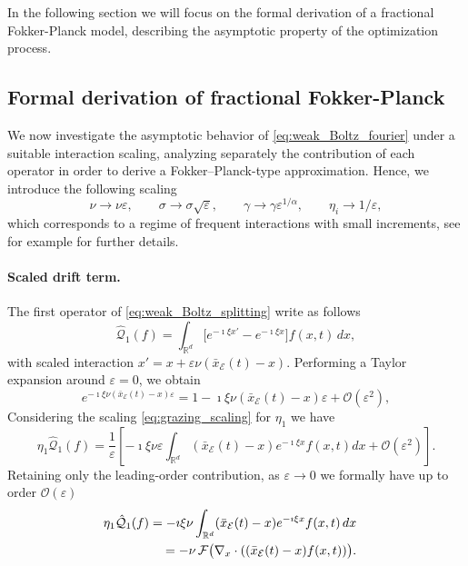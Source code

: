 \documentclass[11pt,handout]{article}%
\numberwithin{equation}{section}
\theoremstyle{definition}
\def\RR{\mathbb R}
\begin{document}
In the following section we will focus on the formal derivation of a fractional Fokker-Planck model, describing the asymptotic property of the optimization process.

\subsection{Formal derivation of fractional Fokker-Planck}\label{sec:FPE} 
We now investigate the asymptotic behavior of \eqref{eq:weak_Boltz_fourier} under a suitable interaction scaling, analyzing separately the contribution of each operator in order to derive a Fokker--Planck-type approximation. Hence, we introduce the following scaling 
\begin{equation}\label{eq:grazing_scaling}
	\nu \to \nu \varepsilon, \qquad
	\sigma \to \sigma \sqrt{\varepsilon}, \qquad
	\gamma \to \gamma \varepsilon^{1/\alpha}, \qquad
	\eta_i \to {1}/{\varepsilon},
\end{equation}
which corresponds to a regime of frequent interactions with small increments, see for example
\cite{pareschi2013interacting} for further details. 
\paragraph{Scaled drift term.}
The first operator of \eqref{eq:weak_Boltz_splitting} write as follows
\begin{equation}\label{eq:operator_Q1_fourier}
	\hat{\mathcal{Q}}_1(f) 
	= \int_{\mathbb{R}^d} \big[e^{-\imath \xi x'} - e^{-\imath \xi x}\big] f(x,t)\,dx,
\end{equation}
with scaled interaction $x' = x + \varepsilon\nu(\bar{x}_\mathcal{E}(t)-x)$. Performing a Taylor expansion around $\varepsilon=0$, we obtain
\begin{equation}
	e^{-\imath \xi \nu( \bar{x}_\mathcal{E}(t) -x) \varepsilon}= 1 - \imath \xi \nu ( \bar{x}_\mathcal{E}(t) -x) \varepsilon + \mathcal{O}(\varepsilon^2),  %
\end{equation}
Considering the scaling \eqref{eq:grazing_scaling} for $\eta_1$  we have
\begin{equation}
	\eta_1 \hat{\mathcal{Q}}_1(f) = \frac{1}{\varepsilon} \left[ -\imath \xi \nu \varepsilon \int_{\RR^d} (\bar{x}_\mathcal{E}(t) -x)  e^{-\imath \xi x} f(x,t) dx  + \mathcal{O}(\varepsilon^2) \right].%
\end{equation}
Retaining only the leading-order contribution, as $\varepsilon\to 0$ we formally have up to order $\mathcal{O}(\varepsilon)$
\begin{align}\label{eq:drift_fourier_final}
	\eta_1 \hat{\mathcal{Q}}_1(f)
	&= -\imath \xi \nu \int_{\mathbb{R}^d} (\bar{x}_\mathcal{E}(t) - x) e^{-\imath \xi x} f(x,t)\,dx\cr
	&\quad= -\nu\, \mathcal{F}\big(\nabla_x \cdot ((\bar{x}_\mathcal{E}(t)-x) f(x,t))\big).
\end{align}
\end{document}
